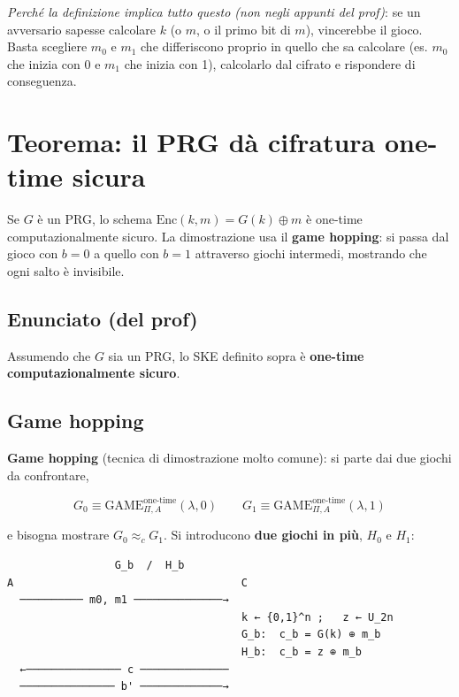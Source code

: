 \emph{Perché la definizione implica tutto questo (non negli appunti del prof)}: se un avversario sapesse calcolare \(k\) (o \(m\), o il primo bit di \(m\)), vincerebbe il gioco. Basta scegliere \(m_0\) e \(m_1\) che differiscono proprio in quello che sa calcolare (es. \(m_0\) che inizia con 0 e \(m_1\) che inizia con 1), calcolarlo dal cifrato e rispondere di conseguenza.

\section{Teorema: il PRG dà cifratura one-time sicura}

\begin{inbreve}

Se \(G\) è un PRG, lo schema \(\text{Enc}(k, m) = G(k) \oplus m\) è one-time computazionalmente sicuro. La dimostrazione usa il \textbf{game hopping}: si passa dal gioco con \(b = 0\) a quello con \(b = 1\) attraverso giochi intermedi, mostrando che ogni salto è invisibile.

\end{inbreve}

\subsection{Enunciato (del prof)}

Assumendo che \(G\) sia un PRG, lo SKE definito sopra è \textbf{one-time computazionalmente sicuro}.

\subsection{Game hopping}

\textbf{Game hopping} (tecnica di dimostrazione molto comune): si parte dai due giochi da confrontare,

\[
G_0 \equiv \text{GAME}^{\text{one-time}}_{\Pi, A}(\lambda, 0) \qquad G_1 \equiv \text{GAME}^{\text{one-time}}_{\Pi, A}(\lambda, 1)
\]

e bisogna mostrare \(G_0 \approx_c G_1\). Si introducono \textbf{due giochi in più}, \(H_0\) e \(H_1\):

\begin{verbatim}
                 G_b  /  H_b
A                                    C
  ────────── m0, m1 ──────────────→
                                     k ← {0,1}^n ;   z ← U_2n
                                     G_b:  c_b = G(k) ⊕ m_b
                                     H_b:  c_b = z ⊕ m_b
  ←─────────────── c ──────────────
  ─────────────── b' ─────────────→
\end{verbatim}

